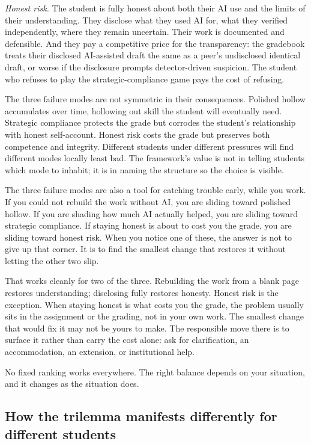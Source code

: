 \documentclass{SIAMbook2023}
\begin{document}
\textit{Honest risk.} The student is fully honest about both their AI use and the limits of their understanding. They disclose what they used AI for, what they verified independently, where they remain uncertain. Their work is documented and defensible. And they pay a competitive price for the transparency: the gradebook treats their disclosed AI-assisted draft the same as a peer's undisclosed identical draft, or worse if the disclosure prompts detector-driven suspicion. The student who refuses to play the strategic-compliance game pays the cost of refusing.

The three failure modes are not symmetric in their consequences. Polished hollow accumulates over time, hollowing out skill the student will eventually need. Strategic compliance protects the grade but corrodes the student's relationship with honest self-account. Honest risk costs the grade but preserves both competence and integrity. Different students under different pressures will find different modes locally least bad. The framework's value is not in telling students which mode to inhabit; it is in naming the structure so the choice is visible.

The three failure modes are also a tool for catching trouble early, while you work. If you could not rebuild the work without AI, you are sliding toward polished hollow. If you are shading how much AI actually helped, you are sliding toward strategic compliance. If staying honest is about to cost you the grade, you are sliding toward honest risk. When you notice one of these, the answer is not to give up that corner. It is to find the smallest change that restores it without letting the other two slip.

That works cleanly for two of the three. Rebuilding the work from a blank page restores understanding; disclosing fully restores honesty. Honest risk is the exception. When staying honest is what costs you the grade, the problem usually sits in the assignment or the grading, not in your own work. The smallest change that would fix it may not be yours to make. The responsible move there is to surface it rather than carry the cost alone: ask for clarification, an accommodation, an extension, or institutional help.

No fixed ranking works everywhere. The right balance depends on your situation, and it changes as the situation does.

\subsection{How the trilemma manifests differently for different students}
\label{subsec:trilemma-dimensions}
\end{document}
